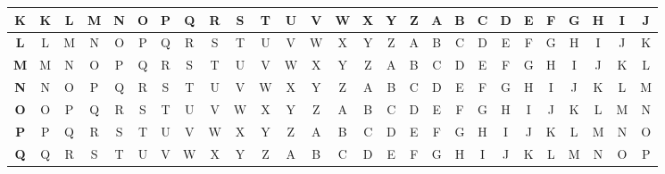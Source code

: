 \begin{table}[H]
{\begin{tabular}{c|c|c|c|c|c|c|c|c|c|c|c|c|c|c|c|c|c|c|c|c|c|c|c|c|c|c|}
            \hline
            \textbf{K} & K          & L          & M          & N          & O          & P          & Q          & R          & S          & T          & U          & V          & W          & X          & Y          & Z          & A          & B          & C          & D          & E          & F          & G          & H          & I          & J          \\[-1ex]
            \hline
            \textbf{L} & L          & M          & N          & O          & P          & Q          & R          & S          & T          & U          & V          & W          & X          & Y          & Z          & A          & B          & C          & D          & E          & F          & G          & H          & I          & J          & K          \\[-1ex]
            \hline
            \textbf{M} & M          & N          & O          & P          & Q          & R          & S          & T          & U          & V          & W          & X          & Y          & Z          & A          & B          & C          & D          & E          & F          & G          & H          & I          & J          & K          & L          \\[-1ex]
            \hline
            \textbf{N} & N          & O          & P          & Q          & R          & S          & T          & U          & V          & W          & X          & Y          & Z          & A          & B          & C          & D          & E          & F          & G          & H          & I          & J          & K          & L          & M          \\[-1ex]
            \hline
            \textbf{O} & O          & P          & Q          & R          & S          & T          & U          & V          & W          & X          & Y          & Z          & A          & B          & C          & D          & E          & F          & G          & H          & I          & J          & K          & L          & M          & N          \\[-1ex]
            \hline
            \textbf{P} & P          & Q          & R          & S          & T          & U          & V          & W          & X          & Y          & Z          & A          & B          & C          & D          & E          & F          & G          & H          & I          & J          & K          & L          & M          & N          & O          \\[-1ex]
            \hline
            \textbf{Q} & Q          & R          & S          & T          & U          & V          & W          & X          & Y          & Z          & A          & B          & C          & D          & E          & F          & G          & H          & I          & J          & K          & L          & M          & N          & O          & P          \\[-1ex]

\end{tabular}}
\end{table}
